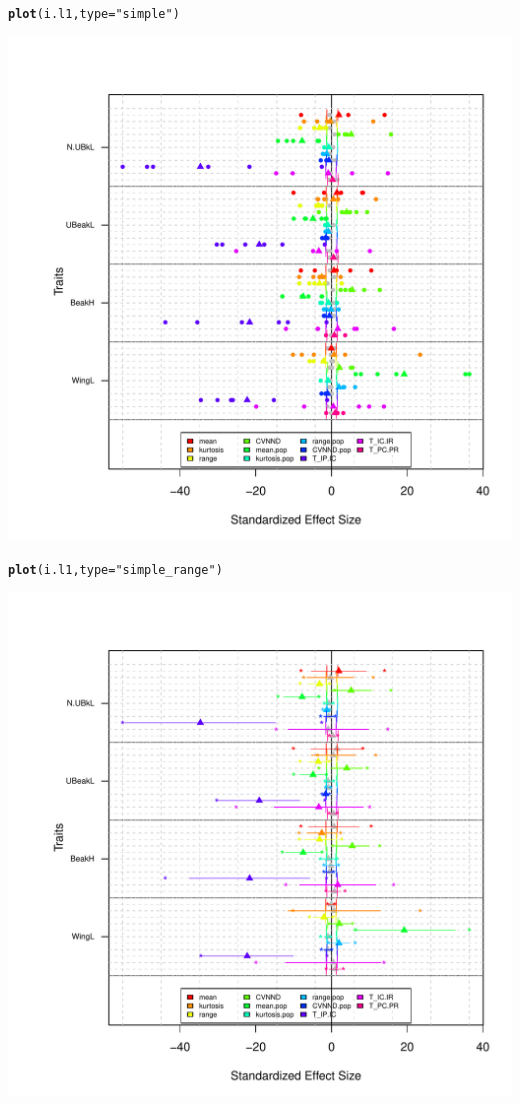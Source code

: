 \documentclass[12pt]{article}\usepackage[]{graphicx}\usepackage[]{color}
\makeatletter
\def\maxwidth{ %
  \ifdim\Gin@nat@width>\linewidth
    \linewidth
  \else
    \Gin@nat@width
  \fi
}
\newcommand{\hlstr}[1]{\textcolor[rgb]{0.192,0.494,0.8}{#1}}%
\newcommand{\hlstd}[1]{\textcolor[rgb]{0.345,0.345,0.345}{#1}}%
\newcommand{\hlkwc}[1]{\textcolor[rgb]{0.333,0.667,0.333}{#1}}%
\newcommand{\hlkwd}[1]{\textcolor[rgb]{0.737,0.353,0.396}{\textbf{#1}}}%
\newenvironment{kframe}{%
 \def\at@end@of@kframe{}%
 \ifinner\ifhmode%
  \def\at@end@of@kframe{\end{minipage}}%
  \begin{minipage}{\columnwidth}%
 \fi\fi%
 \def\FrameCommand##1{\hskip\@totalleftmargin \hskip-\fboxsep
 \colorbox{shadecolor}{##1}\hskip-\fboxsep
     \hskip-\linewidth \hskip-\@totalleftmargin \hskip\columnwidth}%
 \MakeFramed {\advance\hsize-\width
   \@totalleftmargin\z@ \linewidth\hsize
   \@setminipage}}%
 {\par\unskip\endMakeFramed%
 \at@end@of@kframe}
\newenvironment{knitrout}{}{} %
\makeatother
\begin{document}
\begin{knitrout}
\color{fgcolor}\begin{kframe}
\begin{alltt}
\hlkwd{plot}\hlstd{(i.l1,} \hlkwc{type} \hlstd{=} \hlstr{"simple"}\hlstd{)}
\end{alltt}
\end{kframe}
\includegraphics[width=\maxwidth]{figure/unnamed-chunk-331} 
\begin{kframe}\begin{alltt}
\hlkwd{plot}\hlstd{(i.l1,} \hlkwc{type} \hlstd{=} \hlstr{"simple_range"}\hlstd{)}
\end{alltt}
\end{kframe}
\includegraphics[width=\maxwidth]{figure/unnamed-chunk-332} 

\end{knitrout}
\end{document}
